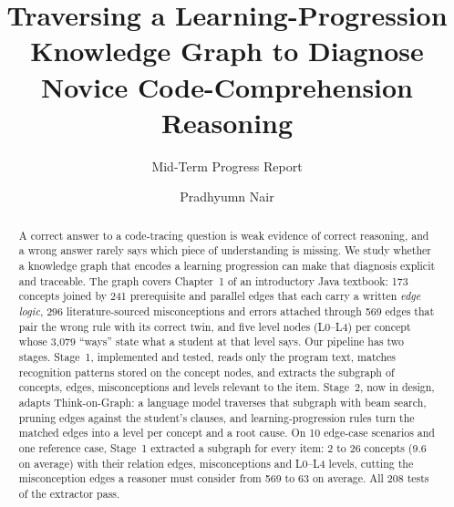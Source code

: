 \documentclass[sigconf,nonacm]{acmart}
\begin{document}
\title{Traversing a Learning-Progression Knowledge Graph to Diagnose Novice Code-Comprehension Reasoning}
\subtitle{Mid-Term Progress Report}

\author{Pradhyumn Nair}

\begin{abstract}
A correct answer to a code-tracing question is weak evidence of correct reasoning, and a wrong answer
rarely says which piece of understanding is missing. We study whether a knowledge graph that encodes
a learning progression can make that diagnosis explicit and traceable. The graph covers Chapter~1 of an
introductory Java textbook: 173 concepts joined by 241 prerequisite and parallel edges that each carry a
written \emph{edge logic}, 296 literature-sourced misconceptions and errors attached through 569 edges
that pair the wrong rule with its correct twin, and five level nodes (L0--L4) per concept whose 3{,}079
``ways'' state what a student at that level says. Our pipeline has two stages. Stage~1, implemented and
tested, reads only the program text, matches recognition patterns stored on the concept nodes, and
extracts the subgraph of concepts, edges, misconceptions and levels relevant to the item. Stage~2, now
in design, adapts Think-on-Graph: a language model traverses that subgraph with beam search, pruning
edges against the student's clauses, and learning-progression rules turn the matched edges into a level
per concept and a root cause. On 10 edge-case scenarios and one reference case, Stage~1 extracted a subgraph
for every item: 2 to 26 concepts (9.6 on average) with their relation edges, misconceptions and L0--L4 levels,
cutting the misconception edges a reasoner must consider from 569 to 63 on average. All 208 tests of the
extractor pass.
\end{abstract}


\maketitle
\end{document}
